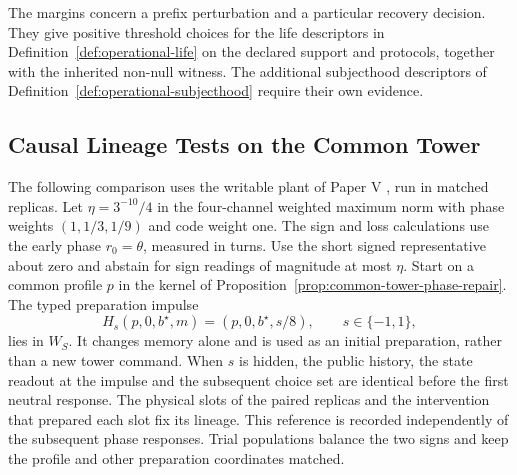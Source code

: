 \documentclass[11pt,a4paper]{article}
\theoremstyle{definition}
\begin{document}
The margins concern a prefix perturbation and a particular recovery decision. They give positive threshold choices for the life descriptors in Definition~\ref{def:operational-life} on the declared support and protocols, together with the inherited non-null witness. The additional subjecthood descriptors of Definition~\ref{def:operational-subjecthood} require their own evidence.

\subsection{Causal Lineage Tests on the Common Tower}

The following comparison uses the writable plant of Paper V \cite{paper5}, run in matched replicas. Let $\eta=3^{-10}/4$ in the four-channel weighted maximum norm with phase weights $(1,1/3,1/9)$ and code weight one. The sign and loss calculations use the early phase $r_0=\theta$, measured in turns. Use the short signed representative about zero and abstain for sign readings of magnitude at most $\eta$. Start on a common profile $p$ in the kernel of Proposition~\ref{prop:common-tower-phase-repair}. The typed preparation impulse
\[
 H_s(p,0,b^\star,m)=(p,0,b^\star,s/8),\qquad s\in\{-1,1\},
\]
lies in $W_S$. It changes memory alone and is used as an initial preparation, rather than a new tower command. When $s$ is hidden, the public history, the state readout at the impulse and the subsequent choice set are identical before the first neutral response. The physical slots of the paired replicas and the intervention that prepared each slot fix its lineage. This reference is recorded independently of the subsequent phase responses. Trial populations balance the two signs and keep the profile and other preparation coordinates matched.
\end{document}
